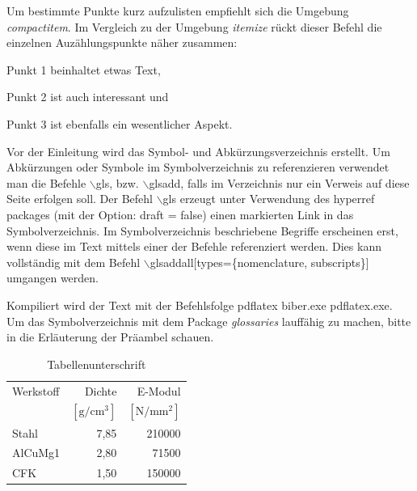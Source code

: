 Um bestimmte Punkte kurz aufzulisten empfiehlt sich die Umgebung \emph{compactitem}. Im Vergleich zu der Umgebung \emph{itemize} rückt dieser Befehl die einzelnen Auzählungspunkte näher zusammen:
\begin{compactitem}
\item Punkt 1 beinhaltet etwas Text,
\item Punkt 2 ist auch interessant und
\item Punkt 3 ist ebenfalls ein wesentlicher Aspekt.
\end{compactitem}

Vor der Einleitung wird das Symbol- und Abkürzungsverzeichnis erstellt. Um Abkürzungen oder Symbole im Symbolverzeichnis zu referenzieren verwendet man die Befehle $\backslash$gls, bzw. $\backslash$glsadd, falls im Verzeichnis nur ein Verweis auf diese Seite erfolgen soll. Der Befehl $\backslash$gls erzeugt unter Verwendung des hyperref packages (mit der Option: draft = false) einen markierten Link in das Symbolverzeichnis. Im Symbolverzeichnis beschriebene Begriffe erscheinen erst, wenn diese im Text mittels einer der Befehle referenziert werden. Dies kann vollständig mit dem Befehl $\backslash$glsaddall[types=\{nomenclature, subscripts\}] umgangen werden.   \glsaddall[types={subscripts,notation}] %

Kompiliert wird der Text mit der Befehlsfolge pdflatex biber.exe pdflatex.exe. Um das Symbolverzeichnis mit dem Package \emph{glossaries} lauffähig zu machen, bitte in die Erläuterung der Präambel schauen.

\begin{table}[bt]
\centering
\begin{tabular}{lrr}
\toprule
Werkstoff	& Dichte				& E-Modul\\
			& $\mathrm{[g/cm^3]}$	& $\mathrm{[N/mm^2]}$\\
\midrule
Stahl		& 7,85					& 210000\\
AlCuMg1 	& 2,80					& 71500\\
CFK			& 1,50					& 150000\\
\bottomrule
\end{tabular}
\caption{Tabellenunterschrift}
\label{tab:refCase_simple}
\end{table}